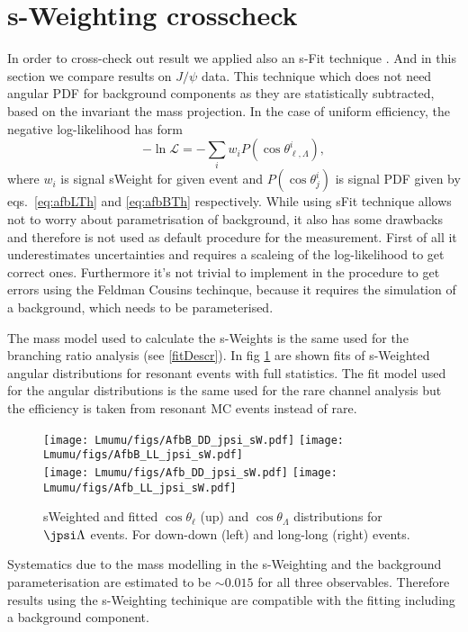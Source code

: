 \section{s-Weighting crosscheck}
\label{app:sWeight}

In order to cross-check out result we applied also an s-Fit technique \cite{Xie:2009rka}. And in this section we compare results on $J/\psi$ data.
This technique which does not need angular PDF for background components as they are statistically subtracted, based
on the invariant the mass projection. In the case of uniform efficiency, the negative log-likelihood has form
\begin{equation}
-\ln\mathcal{L}=-\sum_i w_i P(\cos\theta_{\ell,\Lambda}^i),
\end{equation}
where $w_i$ is signal sWeight for given event and $P(\cos\theta_j^i)$ is signal PDF given by
eqs.~\ref{eq:afbLTh} and \ref{eq:afbBTh} respectively. While using sFit technique allows not to
worry about parametrisation of background, it also has some drawbacks and therefore is not used as default procedure for the measurement.
First of all it underestimates uncertainties and requires a scaleing of the log-likelihood to get correct ones.
Furthermore it's not trivial to implement in the procedure to get errors using the Feldman Cousins techinque,
because it requires the simulation of a background, which needs to be parameterised.

The mass model used to calculate the s-Weights is the same used for the branching ratio analysis (see \ref{fitDescr}).
In fig \ref{fig:sWjpsi} are shown fits of s-Weighted angular distributions for resonant events with full statistics.
The fit model used for the angular distributions is the same used for the rare channel analysis but the
efficiency is taken from resonant MC events instead of rare.

\begin{figure}[h]
\centering
\texttt{[image: Lmumu/figs/AfbB\_DD\_jpsi\_sW.pdf]}
\texttt{[image: Lmumu/figs/AfbB\_LL\_jpsi\_sW.pdf]} \\
\texttt{[image: Lmumu/figs/Afb\_DD\_jpsi\_sW.pdf]}
\texttt{[image: Lmumu/figs/Afb\_LL\_jpsi\_sW.pdf]}
\caption{sWeighted and fitted $\cos\theta_\ell$ (up) and $\cos\theta_\Lambda$ distributions for $\jpsi\Lambda$ events. For down-down (left) and long-long (right) events.  }
\label{fig:sWjpsi}
\end{figure}

Systematics due to the mass modelling in the s-Weighting and the background parameterisation are estimated to be $\sim 0.015$ for all three observables.
Therefore results using the s-Weighting techinique are compatible with the fitting including a background component.
